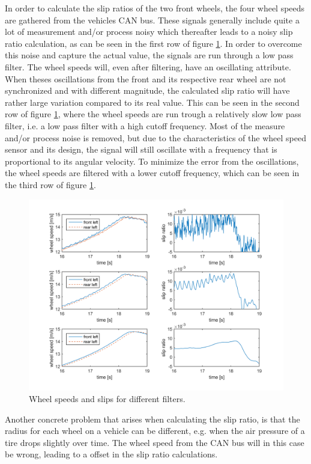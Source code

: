 In order to calculate the slip ratios of the two front wheels, the four wheel speeds are gathered from the vehicles CAN bus. These signals generally include quite a lot of measurement and/or process noisy which thereafter leads to a noisy slip ratio calculation, as can be seen in the first row of figure \ref{wheel_speed_and_slip}. In order to overcome this noise and capture the actual value, the signals are run through a low pass filter. The wheel speeds will, even after filtering, have an oscillating attribute. When theses oscillations from the front and its respective rear wheel are not synchronized and with different magnitude, the calculated slip ratio will have rather large variation compared to its real value. This can be seen in the second row of figure \ref{wheel_speed_and_slip}, where the wheel speeds are run trough a relatively slow low pass filter, i.e. a low pass filter with a high cutoff frequency. Most of the measure and/or process noise is removed, but due to the characteristics of the wheel speed sensor and its design, the signal will still oscillate with a frequency that is proportional to its angular velocity. To minimize the error from the oscillations, the wheel speeds are filtered with a lower cutoff frequency, which can be seen in the third row of figure \ref{wheel_speed_and_slip}. 
\begin{figure}[h]
	\centering
	\includegraphics[width=1.0\textwidth]{Pictures/wheel_speed_and_slip}
	\caption {Wheel speeds and slips for different filters.}
	\label{wheel_speed_and_slip}
\end{figure}
Another concrete problem that arises when calculating the slip ratio, is that the radius for each wheel on a vehicle can be different, e.g. when the air pressure of a tire drops slightly over time. The wheel speed from the CAN bus will in this case be wrong, leading to a offset in the slip ratio calculations. 

